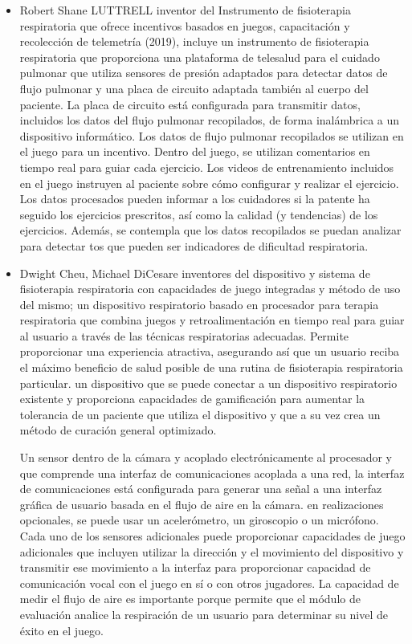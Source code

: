 \begin{itemize}
    \item Robert Shane LUTTRELL inventor del Instrumento de fisioterapia respiratoria que ofrece incentivos basados en juegos, capacitaci\'on y recolecci\'on de telemetr\'ia (2019),  incluye un instrumento de fisioterapia respiratoria que proporciona una plataforma de telesalud para el cuidado pulmonar que utiliza sensores de presi\'on adaptados para detectar datos de flujo pulmonar y una placa de circuito adaptada tambi\'en al cuerpo del paciente. La placa de circuito est\'a configurada para transmitir datos, incluidos los datos del flujo pulmonar recopilados, de forma inal\'ambrica a un dispositivo inform\'atico. Los datos de flujo pulmonar recopilados se utilizan en el juego para un incentivo. Dentro del juego, se utilizan comentarios en tiempo real para guiar cada ejercicio. Los videos de entrenamiento incluidos en el juego instruyen al paciente sobre c\'omo configurar y realizar el ejercicio.  Los datos procesados pueden informar a los cuidadores si la patente ha seguido los ejercicios prescritos, as\'i como la calidad (y tendencias) de los ejercicios. Adem\'as, se contempla que los datos recopilados se puedan analizar para detectar tos que pueden ser indicadores de dificultad respiratoria.\cite{46}
    
    \item Dwight Cheu, Michael DiCesare inventores del dispositivo y sistema de fisioterapia respiratoria con capacidades de juego integradas y m\'etodo de uso del mismo; un dispositivo respiratorio basado en procesador para terapia respiratoria que combina juegos y retroalimentaci\'on en tiempo real para guiar al usuario a trav\'es de las t\'ecnicas respiratorias adecuadas. Permite proporcionar una experiencia atractiva, asegurando as\'i que un usuario reciba el m\'aximo beneficio de salud posible de una rutina de fisioterapia respiratoria particular. un dispositivo que se puede conectar a un dispositivo respiratorio existente y proporciona capacidades de gamificaci\'on  para aumentar la tolerancia de un paciente que utiliza el dispositivo y que a su vez crea un m\'etodo de curaci\'on general optimizado. \cite{47}
    
    Un sensor dentro de la c\'amara y acoplado electr\'onicamente al procesador y que comprende una interfaz de comunicaciones acoplada a una red, la interfaz de comunicaciones est\'a configurada para generar una se\~{n}al a una interfaz gr\'afica de usuario basada en el flujo de aire en la c\'amara. en realizaciones opcionales, se puede usar un aceler\'ometro, un giroscopio  o un micr\'ofono. Cada uno de los sensores adicionales puede proporcionar capacidades de juego adicionales que incluyen utilizar la direcci\'on y el movimiento del dispositivo y transmitir ese movimiento a la interfaz para proporcionar capacidad de comunicaci\'on vocal con el juego en s\'i o con otros jugadores.  La capacidad de medir el flujo de aire es importante porque permite que el m\'odulo de evaluaci\'on analice la respiraci\'on de un usuario para determinar su nivel de \'exito en el juego. \cite{47}



\end{itemize}

